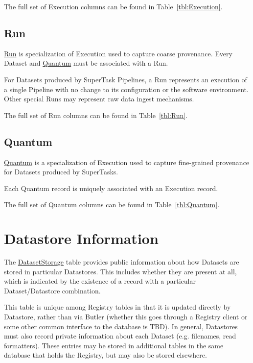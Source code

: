 \documentclass[DM,toc]{lsstdoc}
\newcommand{\tblref}[1]{\hyperref[tbl:#1]{#1}}
\newcommand{\coltable}[1]{
    \begin{table}[htb]
        {
            \footnotesize
            
        }
        \caption{#1 Columns}
        \label{tbl:#1}
    \end{table}
}
\begin{document}
The full set of Execution columns can be found in Table~\ref{tbl:Execution}.

\coltable{Execution}

\subsection{Run}
\label{sec:run}

\tblref{Run} is specialization of Execution used to capture coarse provenance.
Every Dataset and \hyperref[sec:quantum]{Quantum} must be associated with a Run.

For Datasets produced by SuperTask Pipelines, a Run represents an execution of a single Pipeline with no change to its configuration or the software environment.
Other special Runs may represent raw data ingest mechanisms.

The full set of Run columns can be found in Table~\ref{tbl:Run}.

\coltable{Run}

\subsection{Quantum}
\label{sec:quantum}

\tblref{Quantum} is a specialization of Execution used to capture fine-grained provenance for Datasets produced by SuperTasks.

Each Quantum record is uniquely associated with an Execution record.

The full set of Quantum columns can be found in Table~\ref{tbl:Quantum}.

\coltable{Quantum}

\section{Datastore Information}
\label{sec:datastore-information}

The \tblref{DatasetStorage} table provides public information about how Datasets are stored in particular Datastores.  This includes whether they are present at all, which is indicated by the existence of a record with a particular Dataset/Datastore combination.

\coltable{DatasetStorage}

This table is unique among Registry tables in that it is updated directly by Datastore, rather than via Butler (whether this goes through a Registry client or some other common interface to the database is TBD).
In general, Datastores must also record private information about each Dataset (e.g. filenames, read formatters).
These entries may be stored in additional tables in the same database that holds the Registry, but may also be stored elsewhere.
\end{document}
